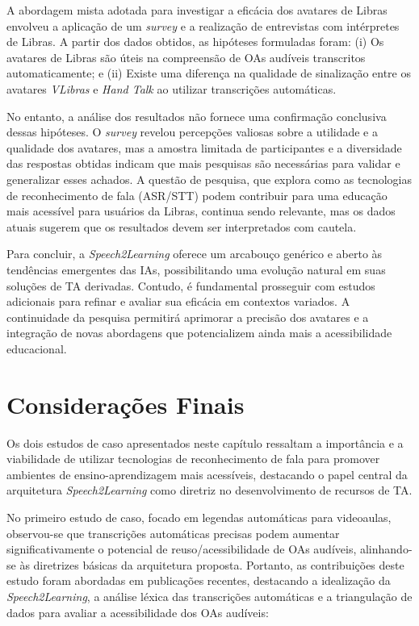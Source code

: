 A abordagem mista adotada para investigar a eficácia dos avatares de Libras envolveu a aplicação de um \textit{survey} e a realização de entrevistas com intérpretes de Libras. A partir dos dados obtidos, as hipóteses formuladas foram: (i) Os avatares de Libras são úteis na compreensão de OAs audíveis transcritos automaticamente; e (ii) Existe uma diferença na qualidade de sinalização entre os avatares \textit{VLibras} e \textit{Hand Talk} ao utilizar transcrições automáticas.

No entanto, a análise dos resultados não fornece uma confirmação conclusiva dessas hipóteses. O \textit{survey} revelou percepções valiosas sobre a utilidade e a qualidade dos avatares, mas a amostra limitada de participantes e a diversidade das respostas obtidas indicam que mais pesquisas são necessárias para validar e generalizar esses achados. A questão de pesquisa, que explora como as tecnologias de reconhecimento de fala (ASR/STT) podem contribuir para uma educação mais acessível para usuários da Libras, continua sendo relevante, mas os dados atuais sugerem que os resultados devem ser interpretados com cautela.

Para concluir, a \textit{Speech2Learning} oferece um arcabouço genérico e aberto às tendências emergentes das IAs, possibilitando uma evolução natural em suas soluções de TA derivadas. Contudo, é fundamental prosseguir com estudos adicionais para refinar e avaliar sua eficácia em contextos variados. A continuidade da pesquisa permitirá aprimorar a precisão dos avatares e a integração de novas abordagens que potencializem ainda mais a acessibilidade educacional.

\section{Considerações Finais}

Os dois estudos de caso apresentados neste capítulo ressaltam a importância e a viabilidade de utilizar tecnologias de reconhecimento de fala para promover ambientes de ensino-aprendizagem mais acessíveis, destacando o papel central da arquitetura \textit{Speech2Learning} como diretriz no desenvolvimento de recursos de TA. 

No primeiro estudo de caso, focado em legendas automáticas para videoaulas, observou-se que transcrições automáticas precisas podem aumentar significativamente o potencial de reuso/acessibilidade de OAs audíveis, alinhando-se às diretrizes básicas da arquitetura proposta. Portanto, as contribuições deste estudo foram abordadas em publicações recentes, destacando a idealização da \textit{Speech2Learning}, a análise léxica das transcrições automáticas e a triangulação de dados para avaliar a acessibilidade dos OAs audíveis:

